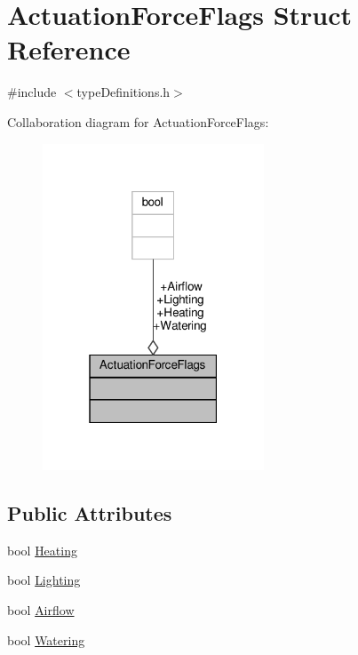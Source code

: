 \hypertarget{structActuationForceFlags}{}\section{Actuation\+Force\+Flags Struct Reference}
\label{structActuationForceFlags}


{\ttfamily \#include $<$type\+Definitions.\+h$>$}



Collaboration diagram for Actuation\+Force\+Flags\+:\nopagebreak
\begin{figure}[H]
\begin{center}
\leavevmode
\includegraphics[width=187pt]{structActuationForceFlags__coll__graph}
\end{center}
\end{figure}
\subsection*{Public Attributes}
\begin{DoxyCompactItemize}
\item 
bool \hyperlink{structActuationForceFlags_a6c9c69d9337857666a4ebf38893537cb}{Heating}
\item 
bool \hyperlink{structActuationForceFlags_ad624645b72bca1c2297753232ef62199}{Lighting}
\item 
bool \hyperlink{structActuationForceFlags_a9aaf65e5568fef8b8e9a4d9954bd6dfa}{Airflow}
\item 
bool \hyperlink{structActuationForceFlags_a3b0aaec5415e016afa53f2753b3a3505}{Watering}
\end{DoxyCompactItemize}


